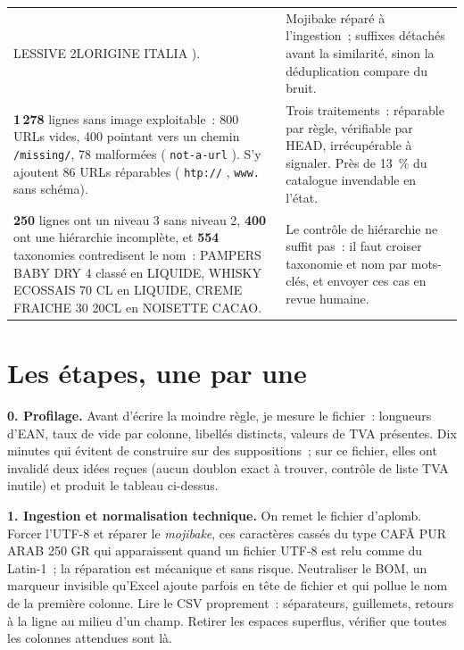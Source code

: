 \documentclass[11pt,a4paper]{article}
\begin{document}
\begin{tabularx}{\linewidth}{L{7.9cm} X}
\guillemotleft{} LESSIVE 2LORIGINE ITALIA \guillemotright{}). &
Mojibake réparé à l'ingestion~; suffixes détachés avant la similarité, sinon la déduplication
compare du bruit. \\
\addlinespace
\textbf{1\,278} lignes sans image exploitable~: 800 URLs vides, 400 pointant vers un chemin
\texttt{/missing/}, 78 malformées (\guillemotleft{} \texttt{not-a-url} \guillemotright{}). S'y ajoutent 86 URLs réparables
(\guillemotleft{} \texttt{htp://} \guillemotright{}, \guillemotleft{} \texttt{www.} \guillemotright{} sans schéma). &
Trois traitements~: réparable par règle, vérifiable par HEAD, irrécupérable à signaler. Près de
13~\% du catalogue invendable en l'état. \\
\addlinespace
\textbf{250} lignes ont un niveau 3 sans niveau 2, \textbf{400} ont une hiérarchie incomplète, et
\textbf{554} taxonomies contredisent le nom~: \guillemotleft{} PAMPERS BABY DRY 4 \guillemotright{} classé en LIQUIDE,
\guillemotleft{} WHISKY ECOSSAIS 70 CL \guillemotright{} en LIQUIDE, \guillemotleft{} CREME FRAICHE 30 20CL \guillemotright{} en NOISETTE CACAO. &
Le contrôle de hiérarchie ne suffit pas~: il faut croiser taxonomie et nom par mots-clés, et
envoyer ces cas en revue humaine. \\
\bottomrule
\end{tabularx}

\section*{Les étapes, une par une}

\textbf{0. Profilage.} Avant d'écrire la moindre règle, je mesure le fichier~: longueurs d'EAN,
taux de vide par colonne, libellés distincts, valeurs de TVA présentes. Dix minutes qui évitent de
construire sur des suppositions~; sur ce fichier, elles ont invalidé deux idées reçues (aucun
doublon exact à trouver, contrôle de liste TVA inutile) et produit le tableau ci-dessus.

\textbf{1. Ingestion et normalisation technique.} On remet le fichier d'aplomb. Forcer l'UTF-8 et
réparer le \emph{mojibake}, ces caractères cassés du type \guillemotleft{} CAFÃ\textperthousand{} PUR ARAB 250 GR \guillemotright{} qui
apparaissent quand un fichier UTF-8 est relu comme du Latin-1~; la réparation est mécanique et sans
risque. Neutraliser le BOM, un marqueur invisible qu'Excel ajoute parfois en tête de fichier et qui
pollue le nom de la première colonne. Lire le CSV proprement~: séparateurs, guillemets, retours à la
ligne au milieu d'un champ. Retirer les espaces superflus, vérifier que toutes les colonnes attendues
sont là.
\end{document}
